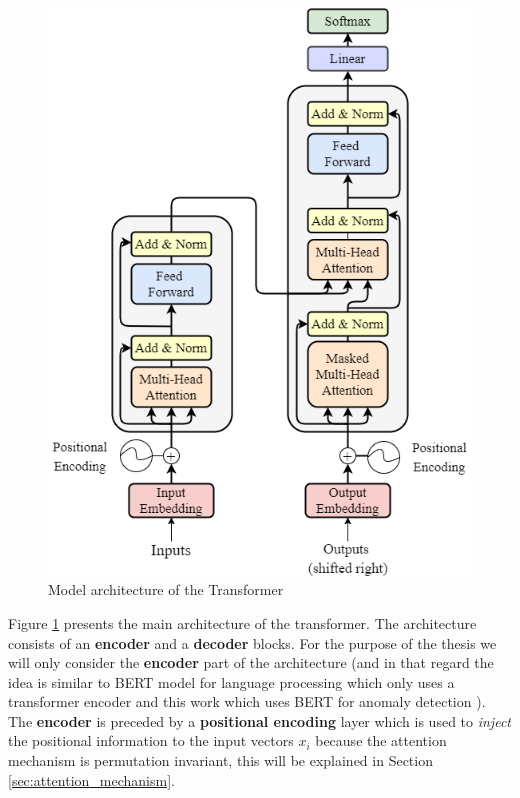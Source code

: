 \documentclass[a4paper, twoside]{report}
\theoremstyle{definition}
\numberwithin{equation}{section}
\begin{document}
\begin{figure}[h]
    \centering
    \includegraphics[scale=0.5]{attention_is_all_you_need.png}
    \caption{Model architecture of the Transformer \cite{1706.03762}}
    \label{fig:attention_is_all_you_need}
\end{figure}

Figure \ref{fig:attention_is_all_you_need} presents the main architecture of the transformer.
The architecture consists of an \textbf{encoder} and a \textbf{decoder} blocks.
For the purpose of the thesis we will only consider the \textbf{encoder} part of the architecture
(and in that regard the idea is similar to BERT model for language processing \cite{Devlin2019BERTPO}
which only uses a transformer encoder and this work which uses BERT for anomaly detection \cite{Jeong2023AnomalyBERTST}).
The \textbf{encoder} is preceded by a \textbf{positional encoding} layer which is used to \emph{inject} the positional information
to the input vectors $x_i$ because the attention mechanism is permutation invariant,
this will be explained in Section \ref{sec:attention_mechanism}.
\end{document}
